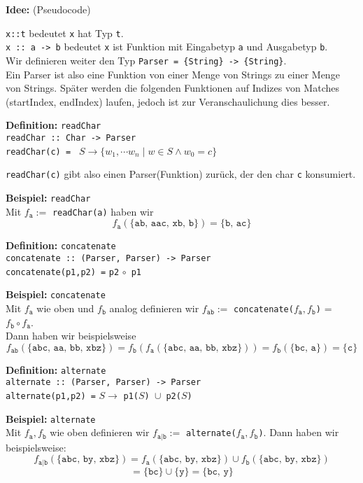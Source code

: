 \documentclass[a4paper,graphics,11pt]{article}
\begin{document}
\textbf{Idee:} (Pseudocode)

\texttt{x::t} bedeutet \texttt{x} hat Typ \texttt{t}.\\
\texttt{x :: a -> b} bedeutet \texttt{x} ist Funktion mit Eingabetyp \texttt{a}
und Ausgabetyp \texttt{b}.\\
Wir definieren weiter den Typ \texttt{Parser = \{String\} -> \{String\}}.\\
Ein Parser ist also eine Funktion von einer Menge von Strings zu einer Menge von Strings.
Später werden die folgenden Funktionen auf Indizes von Matches (startIndex, endIndex) laufen, jedoch
ist zur Veranschaulichung dies besser.

\textbf{Definition:} \texttt{readChar}
\texttt{\\
    readChar :: Char -> Parser\\
    readChar(c) =
} $S \to \{w_1, \cdots w_n \mid w \in S \land w_0 = c\}$

\texttt{readChar(c)} gibt also einen Parser(Funktion) zurück, der den char \texttt{c} konsumiert.

\textbf{Beispiel:} \texttt{readChar}\\
Mit $f_\texttt{a} :=$ \texttt{readChar(\texttt{a})} haben wir
$$
    f_\texttt{a}(\{\texttt{ab, aac, xb, b}\}) = \{\texttt{b, ac}\}
$$

\textbf{Definition:} \texttt{concatenate}\\
\texttt{concatenate :: (Parser, Parser) -> Parser}\\
\texttt{concatenate(p1,p2) =} \texttt{p2} $\circ$\ \texttt{p1}

\textbf{Beispiel:} \texttt{concatenate}\\
Mit $f_\texttt{a}$ wie oben und $f_\texttt{b}$ analog definieren wir
$f_\texttt{ab} :=$ \texttt{concatenate($f_\texttt{a}, f_\texttt{b}$)} = $f_\texttt{b} \circ f_\texttt{a}$.\\
Dann haben wir beispielsweise
$$
    f_\texttt{ab}(\{\texttt{abc, aa, bb, xbz}\})
    = f_\texttt{b}(f_\texttt{a}(\{\texttt{abc, aa, bb, xbz}\}))
    = f_\texttt{b}(\{\texttt{bc, a}\})
    = \{\texttt{c}\}
$$

\textbf{Definition:} \texttt{alternate}\\
\texttt{alternate :: (Parser, Parser) -> Parser}\\
\texttt{alternate(p1,p2) =} $S \to$ \texttt{p1($S$) $\cup$ p2($S$)}

\textbf{Beispiel:} \texttt{alternate}\\
Mit $f_\texttt{a}, f_\texttt{b}$ wie oben definieren wir
$f_\texttt{a|b} :=$ \texttt{alternate($f_\texttt{a}, f_\texttt{b}$)}. Dann haben wir beispielsweise:
$$
    f_\texttt{a|b}(\{\texttt{abc, by, xbz}\})
    = f_\texttt{a}(\{\texttt{abc, by, xbz}\}) \cup f_\texttt{b}(\{\texttt{abc, by, xbz}\})
$$$$
    = \{\texttt{bc}\} \cup \{\texttt{y}\}
    = \{\texttt{bc, y}\}
$$
\end{document}
